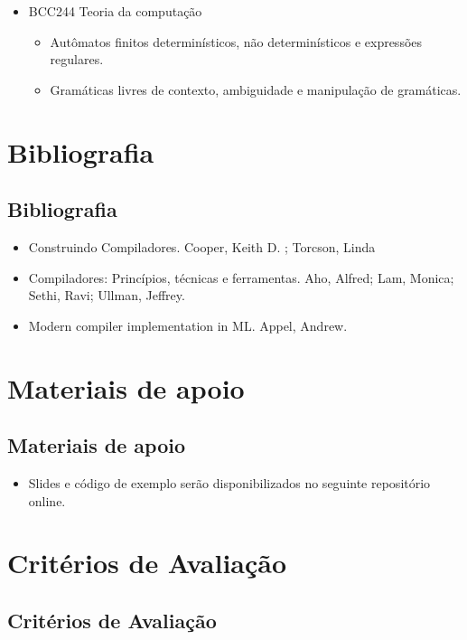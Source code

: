 \documentclass[11pt]{article}
\begin{document}
\begin{itemize}
\item BCC244 Teoria da computação
\begin{itemize}
\item Autômatos finitos determinísticos, não determinísticos e expressões regulares.
\item Gramáticas livres de contexto, ambiguidade e manipulação de gramáticas.
\end{itemize}
\end{itemize}
\section*{Bibliografia}
\label{sec:org506a1b6}

\subsection*{Bibliografia}
\label{sec:orgf5b6934}

\begin{itemize}
\item Construindo Compiladores. Cooper, Keith D. ; Torcson, Linda

\item Compiladores: Princípios, técnicas e ferramentas. Aho, Alfred; Lam,
Monica; Sethi, Ravi; Ullman, Jeffrey.

\item Modern compiler implementation in ML. Appel, Andrew.
\end{itemize}
\section*{Materiais de apoio}
\label{sec:orgee7c105}

\subsection*{Materiais de apoio}
\label{sec:orgdb40a5e}

\begin{itemize}
\item Slides e código de exemplo serão disponibilizados no seguinte
repositório online.
\end{itemize}
\section*{Critérios de Avaliação}
\label{sec:org11bdddc}

\subsection*{Critérios de Avaliação}
\label{sec:orgbb575e4}
\end{document}
